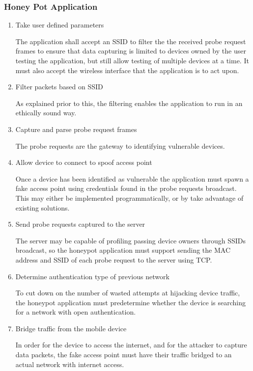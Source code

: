 \label{requirements:specific}
\subsubsection{Honey Pot Application}
\begin{enumerate}
\item Take user defined parameters

The application shall accept an SSID to filter the the received probe request frames to ensure that data capturing is limited to devices owned by the user testing the application, but still allow testing of multiple devices at a time. It must also accept the wireless interface that the application is to act upon.

\item Filter packets based on SSID

As explained prior to this, the filtering enables the application to run in an ethically sound way.

\item Capture and parse probe request frames

The probe requests are the gateway to identifying vulnerable devices.

\item Allow device to connect to spoof access point

Once a device has been identified as vulnerable the application must spawn a fake access point using credentials found in the probe requests broadcast. This may either be implemented programmatically, or by take advantage of existing solutions.

\item Send probe requests captured to the server

The server may be capable of profiling passing device owners through SSIDs broadcast, so the honeypot application must support sending the MAC address and SSID of each probe request to the server using TCP.

\item Determine authentication type of previous network

To cut down on the number of wasted attempts at hijacking device traffic, the honeypot application must predetermine whether the device is searching for a network with open authentication.

\item  Bridge traffic from the mobile device

In order for the device to access the internet, and for the attacker to capture data packets, the fake access point must have their traffic bridged to an actual network with internet access.
\end{enumerate}
